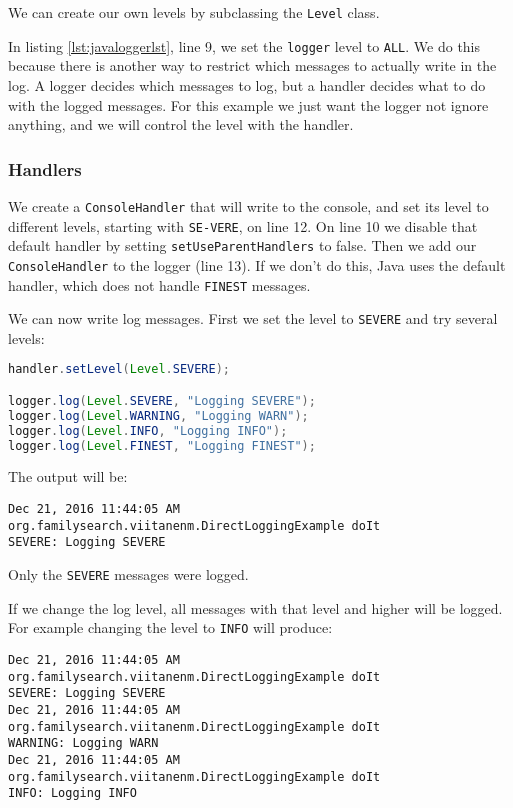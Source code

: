 We can create our own levels by subclassing the \texttt{Level} class\cite{level}.

In listing \ref{lst:javaloggerlst}, line 9, we set the \texttt{logger} level to \texttt{ALL}. We do this because there is another way to restrict which messages to actually write in the log. A logger decides which messages to log, but a handler decides what to do with the logged messages. For this example we just want the logger not ignore anything, and we will control the level with the handler.

\subsubsection{Handlers}
We create a \texttt{ConsoleHandler} that will write to the console, and set its level to different levels, starting with \texttt{SE\hyp{}VERE}, on line 12. On line 10 we disable that default handler by setting \texttt{setUseParentHandlers} to false. Then we add our \texttt{ConsoleHandler} to the logger (line 13). If we don't do this, Java uses the default handler, which does not handle \texttt{FINEST} messages.

We can now write log messages. First we set the level to \texttt{SEVERE} and try several levels:

\begin{lstlisting}[language=Java]
handler.setLevel(Level.SEVERE);

logger.log(Level.SEVERE, "Logging SEVERE");
logger.log(Level.WARNING, "Logging WARN");
logger.log(Level.INFO, "Logging INFO");
logger.log(Level.FINEST, "Logging FINEST");
\end{lstlisting}

The output will be:
\begin{lstlisting}
Dec 21, 2016 11:44:05 AM org.familysearch.viitanenm.DirectLoggingExample doIt
SEVERE: Logging SEVERE
\end{lstlisting}

Only the \texttt{SEVERE}  messages were logged.

If we change the log level, all messages with that level and higher will be logged. For example changing the level to \texttt{INFO} will produce:

\begin{lstlisting}
Dec 21, 2016 11:44:05 AM org.familysearch.viitanenm.DirectLoggingExample doIt
SEVERE: Logging SEVERE
Dec 21, 2016 11:44:05 AM org.familysearch.viitanenm.DirectLoggingExample doIt
WARNING: Logging WARN
Dec 21, 2016 11:44:05 AM org.familysearch.viitanenm.DirectLoggingExample doIt
INFO: Logging INFO
\end{lstlisting}

